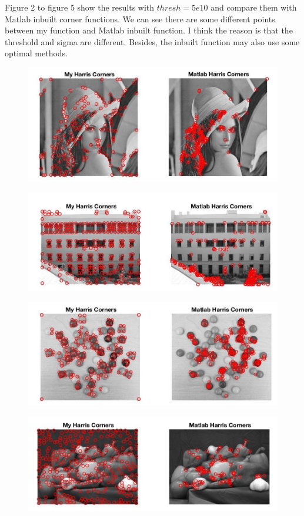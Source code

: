 \documentclass{article}
\begin{document}
Figure 2 to figure 5 show the results with $thresh = 5e10$ and compare them with Matlab inbuilt corner functions. We can see there are some different points between my function and Matlab inbuilt function. I think the reason is that the threshold and sigma are different. Besides, the inbuilt function may also use some optimal methods.
\begin{figure}[htbp]
    \centering
    \includegraphics[scale = 0.25]{fig2.jpg}
    \caption{}
    \label{fig2}
\end{figure}
\begin{figure}[htbp]
    \centering
    \includegraphics[scale = 0.25]{fig3.jpg}
    \caption{}
    \label{fig3}
\end{figure}
\begin{figure}[htbp]
    \centering
    \includegraphics[scale = 0.25]{fig4.jpg}
    \caption{}
    \label{fig4}
\end{figure}
\begin{figure}[htbp]
    \centering
    \includegraphics[scale = 0.25]{fig5.jpg}
    \caption{}
    \label{fig5}
\end{figure}
\end{document}
